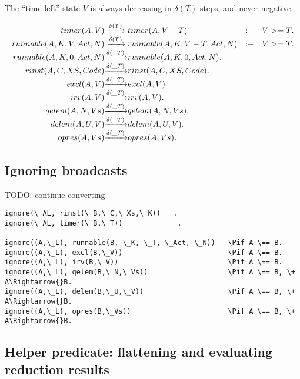 The ``time left'' state \(V\) is always decreasing in \(\delta(T)\) steps, and never negative.

\[
\begin{array}{r@{}c@{}lcl}
  \Preduce{timer(A, V)              }{\delta(T)  }{timer(A, V-T)              } &\Pif&    V >= T.
\\\Preduce{runnable(A, K, V, Act, N)}{\delta(T)  }{runnable(A, K, V-T, Act, N)} &\Pif&    V >= T.
\\\Preduce{runnable(A, K, 0, Act, N)}{\delta(\_T)}{runnable(A, K, 0, Act, N)  }.
\\\Preduce{rinst(A, C, XS, Code)    }{\delta(\_T)}{rinst(A, C, XS, Code)      }.
\\\Preduce{excl(A, V)               }{\delta(\_T)}{excl(A, V)                 }.
\\\Preduce{irv(A, V)                }{\delta(\_T)}{irv(A, V)                  }.
\\\Preduce{qelem(A, N, Vs)          }{\delta(\_T)}{qelem(A, N, Vs)            }.
\\\Preduce{delem(A, U, V)           }{\delta(\_T)}{delem(A, U, V)             }.
\\\Preduce{opres(A, Vs)             }{\delta(\_T)}{opres(A, Vs)               }.
\end{array}
\]

\subsection{Ignoring broadcasts}

TODO: continue converting.

\begin{verbatim}
ignore(\_AL, rinst(\_B,\_C,\_Xs,\_K))   .
ignore(\_AL, timer(\_B,\_T))             .

ignore((A,\_L), runnable(B, \_K, \_T, \_Act, \_N))   \Pif A \== B.
ignore((A,\_L), excl(B,\_V))                         \Pif A \== B.
ignore((A,\_L), irv(B,\_V))                          \Pif A \== B.
ignore((A,\_L), qelem(B,\_N,\_Vs))                   \Pif A \== B, \+ A\Rightarrow{}B.
ignore((A,\_L), delem(B,\_U,\_V))                    \Pif A \== B, \+ A\Rightarrow{}B.
ignore((A,\_L), opres(B,\_Vs))                       \Pif A \== B, \+ A\Rightarrow{}B.
\end{verbatim}


\subsection{Helper predicate: flattening and evaluating reduction results}

